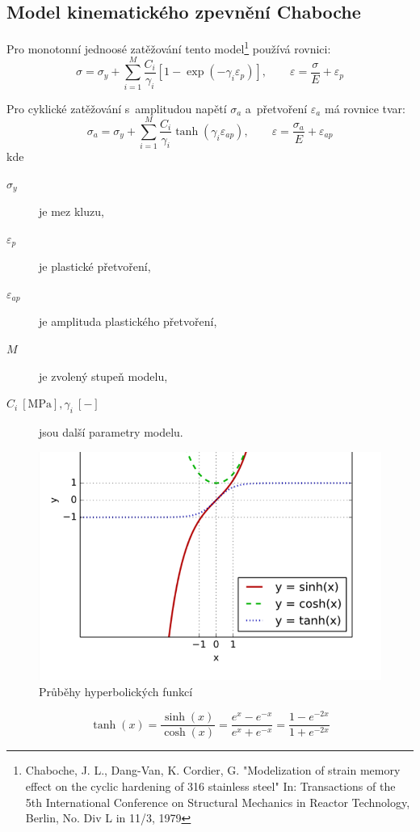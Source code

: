 
\subsection{Model kinematického zpevnění Chaboche}\label{sec:chaboche}
Pro monotonní jednoosé zatěžování tento model\footnote{Chaboche, J. L., Dang-Van, K. Cordier, G. "Modelization of strain memory effect on the cyclic hardening of 316 stainless steel" In: Transactions of the 5th International Conference on Structural Mechanics in Reactor Technology, Berlin, No. Div L in 11/3, 1979} používá rovnici:
\begin{equation}
	\sigma = \sigma_y + \sum\limits_{i=1}^M \frac{C_i}{\gamma_i} \left[ 1 - \exp\left( -\gamma_i \varepsilon_p \right) \right],
	\qquad
	\varepsilon = \frac{\sigma}{E} + \varepsilon_p
\end{equation}

Pro cyklické zatěžování s~amplitudou napětí $\sigma_a$ a~přetvoření $\varepsilon_a$ má rovnice tvar:
\begin{equation}
	\sigma_a = \sigma_y + \sum\limits_{i=1}^M \frac{C_i}{\gamma_i} \tanh\left( \gamma_i \varepsilon_{ap} \right),
	\qquad
	\varepsilon = \frac{\sigma_a}{E} + \varepsilon_{ap}
\end{equation}
kde
\begin{description}
	\item[$\sigma_y$] je mez kluzu,
	\item[$\varepsilon_p$] je plastické přetvoření,
	\item[$\varepsilon_{ap}$] je amplituda plastického přetvoření,
	\item[$M$] je zvolený stupeň modelu,
	\item[{$C_i\:[\si{\mega\pascal}], \gamma_i\:[-]$}] jsou další parametry modelu.
\end{description}

\begin{figure}[H]
	\centering
	\includegraphics[width=0.7\linewidth]{Obrazky/hyperbolicke-funkce}
	\caption{Průběhy hyperbolických funkcí}
	\label{fig:hyperbolicke-funkce}
\end{figure}
\begin{equation}
	\tanh(x) = \frac{\sinh(x)}{\cosh(x)} = \frac{e^x - e^{-x}}{e^x + e^{-x}} = \frac{1 - e^{-2x}}{1 + e^{-2x}}
\end{equation}


